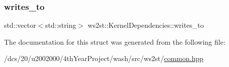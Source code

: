 \mbox{\label{structws2st_1_1KernelDependencies_a85a9ccadcb7d6912675a21cf500a4ef1}} 
\subsubsection{\texorpdfstring{writes\+\_\+to}{writes\_to}}
{\footnotesize\ttfamily std\+::vector$<$std\+::string$>$ ws2st\+::\+Kernel\+Dependencies\+::writes\+\_\+to}



The documentation for this struct was generated from the following file\+:\begin{DoxyCompactItemize}
\item 
/dcs/20/u2002000/4th\+Year\+Project/wash/src/ws2st/\mbox{\hyperlink{common_8hpp}{common.\+hpp}}\end{DoxyCompactItemize}
